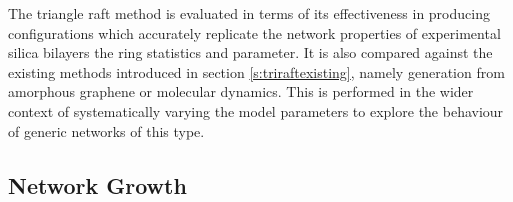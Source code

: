 The triangle raft method is evaluated in terms of its effectiveness in producing configurations which accurately replicate the network properties of experimental silica bilayers \ie{} the ring statistics and \aw{} parameter.
It is also compared against the existing methods introduced in section \ref{s:triraftexisting}, namely generation from amorphous graphene or molecular dynamics.
This is performed in the wider context of systematically varying the model parameters to explore the behaviour of generic networks of this type.

\subsection{Network Growth}
 
\begin{figure}[p]
     \centering
     

\end{figure}
